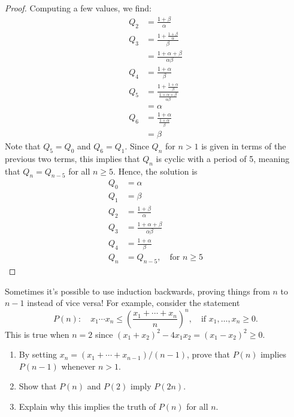 \documentclass[12pt]{article}
\newenvironment{ex}[2][Exercise]{\begin{trivlist}
		\item[\hskip \labelsep {\bfseries #1}\hskip \labelsep {\bfseries #2.}]}{\end{trivlist}}
\newenvironment{sol}[1][Solution]{\begin{trivlist}
		\item[\hskip \labelsep {\bfseries #1:}]}{\end{trivlist}}
\begin{document}
\begin{sol}
	\begin{proof}
		Computing a few values, we find:
		\begin{align*}
			Q_2&=\frac{1+\beta}{\alpha}\\
			Q_3&=\frac{1+\frac{1+\beta}{\alpha}}{\beta}\\
			&=\frac{1+\alpha+\beta}{\alpha\beta}\\
			Q_4&=\frac{1+\alpha}{\beta}\\
			Q_5&=\frac{1+\frac{1+\alpha}{\beta}}{\frac{1+\alpha+\beta}{\alpha\beta}}\\
			&=\alpha\\
			Q_6&=\frac{1+\alpha}{\frac{1+\alpha}{\beta}}\\
			&=\beta
		\end{align*}
		Note that $Q_5=Q_0$ and $Q_6=Q_1$. Since $Q_n$ for $n>1$ is given
		in terms of the previous two terms, this implies that $Q_n$ is cyclic with
		a period of 5, meaning that $Q_{n}=Q_{n-5}$ for all $n\geq 5$. Hence, the solution
		is
		\begin{align*}
			Q_0&=\alpha\\
			Q_1&=\beta\\
			Q_2&=\frac{1+\beta}{\alpha}\\
			Q_3&=\frac{1+\alpha+\beta}{\alpha\beta}\\
			Q_4&=\frac{1+\alpha}{\beta}\\
			Q_{n}&=Q_{n-5},\quad \text{for } n \geq 5
		\end{align*}
	\end{proof}
\end{sol}

\begin{ex}{9}
	Sometimes it's possible to use induction backwards, proving things from
	$n$ to $n-1$ instead of vice versa! For example, consider the statement
	\[
	P(n):\quad x_1\cdots x_n\leq \left(\frac{x_1+\cdots+x_n}{n}\right)^n,\quad
	\text{if } x_1,\ldots,x_n\geq 0.
	\]
	This is true when $n=2$ since $(x_1+x_2)^2-4x_1x_2=(x_1-x_2)^2\geq 0$.
	\begin{enumerate}[label=(\alph*)]
		\item By setting $x_n=(x_1+\cdots+x_{n-1})/(n-1)$, prove that $P(n)$
		implies $P(n-1)$ whenever $n>1$.
		\item Show that $P(n)$ and $P(2)$ imply $P(2n)$.
		\item Explain why this implies the truth of $P(n)$ for all $n$.
	\end{enumerate}
\end{ex}
\end{document}
